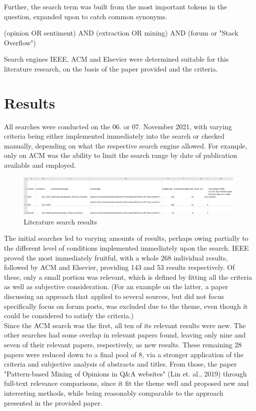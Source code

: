 \documentclass[a4paper,10pt, bibliography=totocnumbered]{scrreprt}
\begin{document}
Further, the search term was built from the most important tokens in the question, expanded upon to catch common synonyms.

\begin{center}
    (opinion OR sentiment) AND (extraction OR mining) AND (forum or "Stack Overflow")
\end{center}

Search engines IEEE, ACM and Elsevier were determined suitable for this literature research, on the basis of the paper provided and the criteria.
\pagebreak

\section{Results}

All searches were conducted on the 06. or 07. November 2021, with varying criteria being either implemented immediately into the search or checked manually, depending on what the respective search engine allowed. For example, only on ACM was the ability to limit the search range by date of publication available and employed.

\begin{figure}[!h]
    \centering
    \includegraphics[scale=0.3]{../images/Thema9_Lit.PNG}
    \caption{Literature search results}
    \label{LitSearchResult}
\end{figure}

The initial searches led to varying amounts of results, perhaps owing partially to the different level of conditions implemented immediately upon the search. IEEE proved the most immediately fruitful, with a whole 268 individual results, followed by ACM and Elsevier, providing 143 and 53 results respectively. Of these, only a small portion was relevant, which is defined by fitting all the criteria as well as subjective consideration. (For an example on the latter, a paper discussing an approach that applied to several sources, but did not focus specifically focus on forum posts, was excluded due to the theme, even though it could be considered to satisfy the criteria.)\\
Since the ACM search was the first, all ten of its relevant results were new. The other searches had some overlap in relevant papers found, leaving only nine and seven of their relevant papers, respectively, as new results. These remaining 28 papers were reduced down to a final pool of 8, via a stronger application of the criteria and subjective analysis of abstracts and titles. From those, the paper "Pattern-based Mining of Opinions in Q\&A websites" (Lin et. al., 2019) \cite{OPINER} through full-text relevance comparisons, since it fit the theme well and proposed new and interesting methods, while being reasonably comparable to the approach presented in the provided paper.
\end{document}
